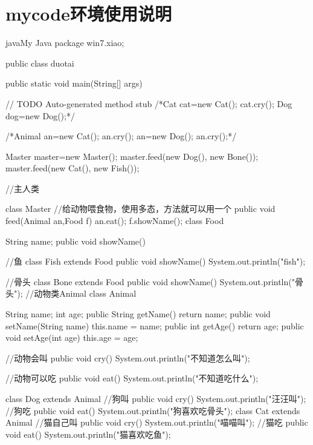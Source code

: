 \documentclass[UTF8, hyperref, fontset = none]{ctexart}
\begin{document}
\section{mycode环境使用说明}
\begin{mycode}{java}{My Java}
package win7.xiao;
  
public class duotai {
    
  public static void main(String[] args) {
      // TODO Auto-generated method stub
      /*Cat cat=new Cat();
      cat.cry();
      Dog dog=new Dog();*/
      
      /*Animal an=new Cat();
      an.cry();
      an=new Dog();
      an.cry();*/
      
      Master master=new Master();
      master.feed(new Dog(), new Bone());
      master.feed(new Cat(), new Fish());
    }
    
  }
  //主人类
  
  class Master
  {
    //给动物喂食物，使用多态，方法就可以用一个
    public void feed(Animal an,Food f)
    {
      an.eat();
      f.showName();
    }
  }
  class Food
  {
    String name;
    public void showName()
    {
      
    }
  }
  
  //鱼
  class Fish extends Food
  {
    public void showName()
    {
      System.out.println("fish");
    }
  }
  
  //骨头
  class Bone extends Food
  {
    public void showName()
    {
      System.out.println("骨头");
    }
  }
  //动物类Animal
  class Animal
  {
    String name;
    int age;
    public String getName() {
      return name;
    }
    public void setName(String name) {
      this.name = name;
    }
    public int getAge() {
      return age;
    }
    public void setAge(int age) {
      this.age = age;
    }
    
    //动物会叫
    public void cry()
    {
      System.out.println("不知道怎么叫");
    }
    
    //动物可以吃
    public void eat()
    {
      System.out.println("不知道吃什么");
    }
  }
  class Dog extends Animal
  {
    //狗叫
    public void cry()
    {
      System.out.println("汪汪叫");
    }
    //狗吃
    public void eat()
    {
      System.out.println("狗喜欢吃骨头");
    }
  }
  class Cat extends Animal
  {
    //猫自己叫
    public void cry()
    {
      System.out.println("喵喵叫");
    }
    //猫吃
    public void eat()
    {
      System.out.println("猫喜欢吃鱼");
    }
  }
\end{mycode}
\end{document}
